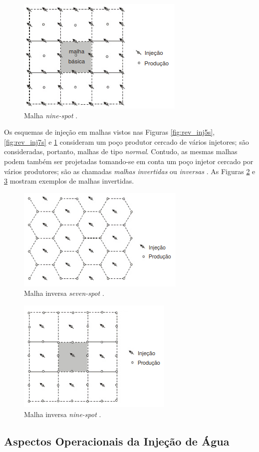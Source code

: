 \begin{figure}[!ht]
\centering
\includegraphics[width=.6\textwidth]{figs/revisao/revisao_inj9s.png}
\caption{Malha \textit{nine-spot} \cite[p. 568]{engres}.}
\label{fig:rev_inj9s}
\end{figure}

Os esquemas de injeção em malhas vistos nas Figuras \ref{fig:rev_inj5s}, \ref{fig:rev_inj7s} e \ref{fig:rev_inj9s} consideram um poço produtor cercado de vários injetores; são consideradas, portanto, malhas de tipo \textit{normal}. Contudo, as mesmas malhas podem também ser projetadas tomando-se em conta um poço injetor cercado por vários produtores; são as chamadas \textit{malhas invertidas} ou \textit{inversas} \cite[p. 569]{engres}. As Figuras \ref{fig:rev_inj7i} e \ref{fig:rev_inj9i} mostram exemplos de malhas invertidas.

\begin{figure}[!ht]
\centering
\includegraphics[width=.6\textwidth]{figs/revisao/revisao_inj7i.png}
\caption{Malha inversa \textit{seven-spot} \cite[p. 569]{engres}.}
\label{fig:rev_inj7i}
\end{figure}

\begin{figure}[!ht]
\centering
\includegraphics[width=.6\textwidth]{figs/revisao/revisao_inj9i.png}
\caption{Malha inversa \textit{nine-spot} \cite[p. 569]{engres}.}
\label{fig:rev_inj9i}
\end{figure}

\subsection{Aspectos Operacionais da Injeção de Água}
